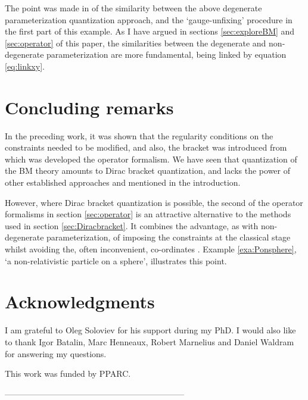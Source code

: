 \documentclass[a4paper,12pt]{article}
\theoremstyle{definition}
\theoremstyle{remark}
\numberwithin{equation}{section}
\begin{document}
{The point was made in \cite{Lyakhovich:2001cm} of the similarity
between the above degenerate parameterization quantization
approach, and the `gauge-unfixing' procedure in the first part of
this example. As I have argued in sections \ref{sec:exploreBM} and
\ref{sec:operator} of this paper, the similarities between the
degenerate and non-degenerate parameterization are more
fundamental, being linked by equation \eqref{eq:linkxy}.
}


\label{exa:Ponsphere}


\section{Concluding remarks}

In the preceding work, it was shown that the regularity conditions
on the constraints needed to be modified, and also, the bracket
\coordHE{} was introduced from which was developed the operator
formalism. We have seen that quantization of the BM theory amounts
to Dirac bracket quantization, and lacks the power of other
established approaches
\cite{Batalin:1987fm,Batalin:1990mb,Batalin:1991jm} and
\cite{Harada:1990aj,Mitra:1990mp} mentioned in the introduction.

However, where Dirac bracket quantization is possible, the second
of the operator formalisms in section \ref{sec:operator} is an
attractive alternative to the methods used in section
\ref{sec:Diracbracket}. It combines the advantage, as with
non-degenerate parameterization, of imposing the constraints at
the classical stage whilst avoiding the, often inconvenient,
co-ordinates \coordHE{}. Example \ref{exa:Ponsphere}, `a
non-relativistic particle on a sphere', illustrates this point.


\medskip
\section*{Acknowledgments}
I am grateful to Oleg Soloviev for his support during my PhD. I
would also like to thank Igor Batalin, Marc Henneaux, Robert
Marnelius and Daniel Waldram for answering my questions.

This work was funded by PPARC.

-----------------------------------------------------------------


\end{document}

